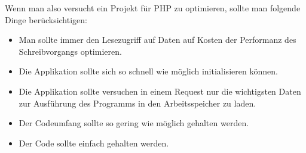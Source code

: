 Wenn man also versucht ein Projekt für PHP zu optimieren, sollte man folgende Dinge berücksichtigen:
\begin{itemize}
\item Man sollte immer den Lesezugriff auf Daten auf Kosten der Performanz des Schreibvorgangs optimieren.
\item Die Applikation sollte sich so schnell wie möglich initialisieren können.
\item Die Applikation sollte versuchen in einem Request nur die wichtigsten Daten zur Ausführung des Programms in den Arbeitsspeicher zu laden.
\item Der Codeumfang sollte so gering wie möglich gehalten werden.
\item Der Code sollte einfach gehalten werden.
\end{itemize}
